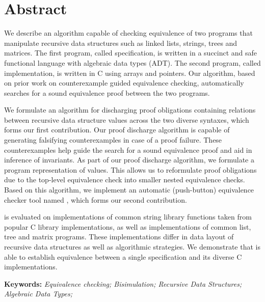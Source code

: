 \chapter*{Abstract}

We describe an algorithm capable of checking
equivalence of two programs that manipulate recursive
data structures such as linked lists, strings, trees
and matrices. The first program, called specification,
is written in a succinct and safe functional language
with algebraic data types (ADT).
The second program, called implementation,
is written in C using arrays and pointers.
Our algorithm, based on prior work on
counterexample guided equivalence checking,
automatically searches for a sound equivalence proof
between the two programs.

\noindent We formulate an algorithm for discharging
proof obligations containing relations
between recursive data structure values across
the two diverse syntaxes, which forms our first contribution.
Our proof discharge algorithm is capable
of generating falsifying counterexamples in case of
a proof failure.
These counterexamples help guide the search for a sound equivalence proof
and aid in inference of invariants.
As part of our proof discharge algorithm,
we formulate a program representation of values.
This allows us to reformulate proof obligations
due to the top-level equivalence check
into smaller nested equivalence checks.
Based on this algorithm,
we implement an automatic (push-button) equivalence checker tool named \toolName{},
which forms our second contribution.

\noindent \toolName{} is evaluated on
implementations of common string library
functions taken from popular C library implementations,
as well as
implementations of common list, tree and matrix programs.
These implementations differ in data layout
of recursive data structures as well as
algorithmic strategies.
We demonstrate that \toolName{} is able to establish equivalence
between a single specification and its diverse C implementations.

\textbf{Keywords:} \textit{Equivalence checking; Bisimulation; Recursive Data Structures; Algebraic Data Types;}
